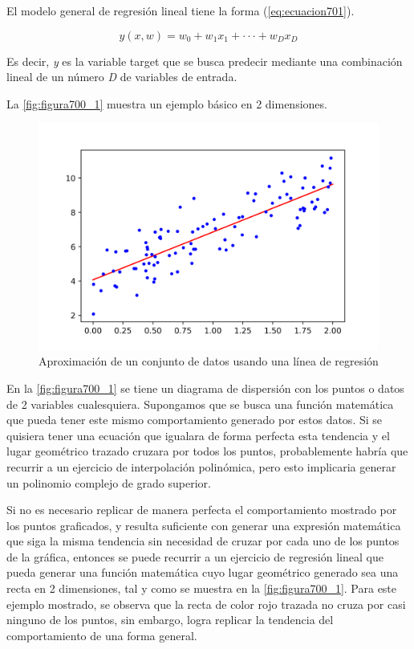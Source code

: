 El modelo general de regresión lineal tiene la forma (\ref{eq:ecuacion701}).

\begin{equation}
	y(x,w)=w_0+w_1x_1+ \cdot \cdot \cdot +w_Dx_D
	\label{eq:ecuacion701}
\end{equation}

Es decir, \textit{y} es la variable target que se busca predecir mediante una combinación lineal de un número \textit{D} de variables de entrada. 

La \autoref{fig:figura700_1} muestra un ejemplo básico en 2 dimensiones.

\begin{figure}[h]
	\centering
	\includegraphics[scale=0.7]{imgss144.png}
	\caption{Aproximación de un conjunto de datos usando una línea de regresión}
	\label{fig:figura700_1}
\end{figure}

En la \autoref{fig:figura700_1} se tiene un diagrama de dispersión con los puntos o datos de 2 variables cualesquiera. Supongamos que se busca una función matemática que pueda tener este mismo comportamiento generado por 
estos datos. Si se quisiera tener una ecuación que igualara de forma perfecta esta tendencia y el lugar geométrico trazado cruzara por todos los puntos, probablemente habría que recurrir a un ejercicio de interpolación 
polinómica, pero esto implicaria generar un polinomio complejo de grado superior.  

Si no es necesario replicar de manera perfecta el comportamiento mostrado por los puntos graficados, y resulta suficiente con generar una expresión matemática que siga la misma tendencia sin necesidad de cruzar por cada 
uno de los puntos de la gráfica, entonces se puede recurrir a un ejercicio de regresión lineal que pueda generar una función matemática cuyo lugar geométrico generado sea una recta en 2 dimensiones, tal y como se muestra 
en la \autoref{fig:figura700_1}. Para este ejemplo mostrado, se observa que la recta de color rojo trazada no cruza por casi ninguno de los puntos, sin embargo, logra replicar la tendencia del comportamiento de una forma 
general.

